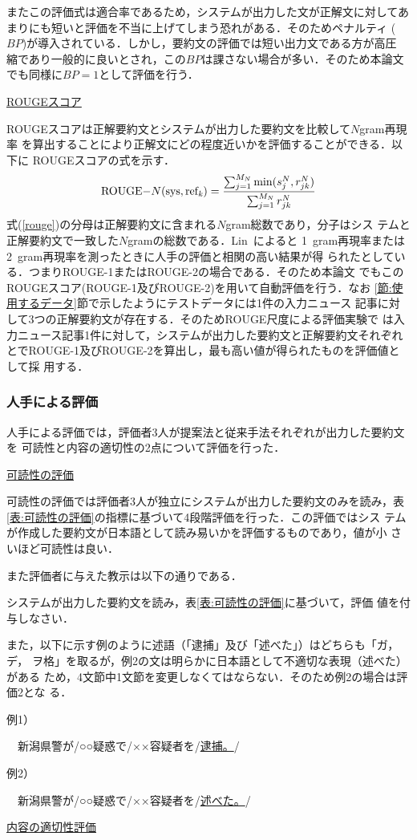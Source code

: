 \documentclass[japanese]{jnlp_1.4}
\begin{document}
またこの評価式は適合率であるため，システムが出力した文が正解文に対してあ
まりにも短いと評価を不当に上げてしまう恐れがある．そのためペナルティ
($BP$)が導入されている．しかし，要約文の評価では短い出力文である方が高圧
縮であり一般的に良いとされ，この$BP$は課さない場合が多い．そのため本論文
でも同様に$BP=1$として評価を行う．

\noindent \ul{\mbox{ROUGEスコア}}

ROUGEスコアは正解要約文とシステムが出力した要約文を比較して$N$gram再現率
を算出することにより正解文にどの程度近いかを評価することができる．以下に
ROUGEスコアの式を示す．
\begin{equation}
 {\rm ROUGE-}N({\rm sys,ref_\mathit{k}})
	=\frac{\sum^{M_N}_{j=1}\min(s^N_j,r_{jk}^N)}{\sum^{M_N}_{j=1}r^N_{jk}}
	\label{rouge}
\end{equation}
式(\ref{rouge})の分母は正解要約文に含まれる$N$gram総数であり，分子はシス
テムと正解要約文で一致した$N$gramの総数である．Lin~\cite{ROUGE}によると
1~gram再現率または2~gram再現率を測ったときに人手の評価と相関の高い結果が得
られたとしている．つまりROUGE-1またはROUGE-2の場合である．そのため本論文
でもこのROUGEスコア(ROUGE-1及びROUGE-2)を用いて自動評価を行う．なお
\ref{節:使用するデータ}節で示したようにテストデータには1件の入力ニュース
記事に対して3つの正解要約文が存在する．そのためROUGE尺度による評価実験で
は入力ニュース記事1件に対して，システムが出力した要約文と正解要約文それぞれ
とでROUGE-1及びROUGE-2を算出し，最も高い値が得られたものを評価値として採
用する．

\subsubsection{人手による評価}\label{節:人手による評価}

人手による評価では，評価者3人が提案法と従来手法それぞれが出力した要約文を
可読性と内容の適切性の2点について評価を行った．

\noindent \ul{可読性の評価}

可読性の評価では評価者3人が独立にシステムが出力した要約文のみを読み，表
\ref{表:可読性の評価}の指標に基づいて4段階評価を行った．この評価ではシス
テムが作成した要約文が日本語として読み易いかを評価するものであり，値が小
さいほど可読性は良い．

\noindent
また評価者に与えた教示は以下の通りである．
\begin{screen}
 システムが出力した要約文を読み，表\ref{表:可読性の評価}に基づいて，評価
 値を付与しなさい．

 また，以下に示す例のように述語（「逮捕」及び「述べた」）はどちらも「ガ，デ，
 ヲ格」を取るが，例2の文は明らかに日本語として不適切な表現（述べた）がある
 ため，4文節中1文節を変更しなくてはならない．そのため例2の場合は評価2とな
 る．

例1）

　新潟県警が/○○疑惑で/××容疑者を/\ul{逮捕。}/

例2）

　新潟県警が/○○疑惑で/××容疑者を/\ul{述べた。}/

\end{screen}
\noindent \ul{内容の適切性評価}
\end{document}
